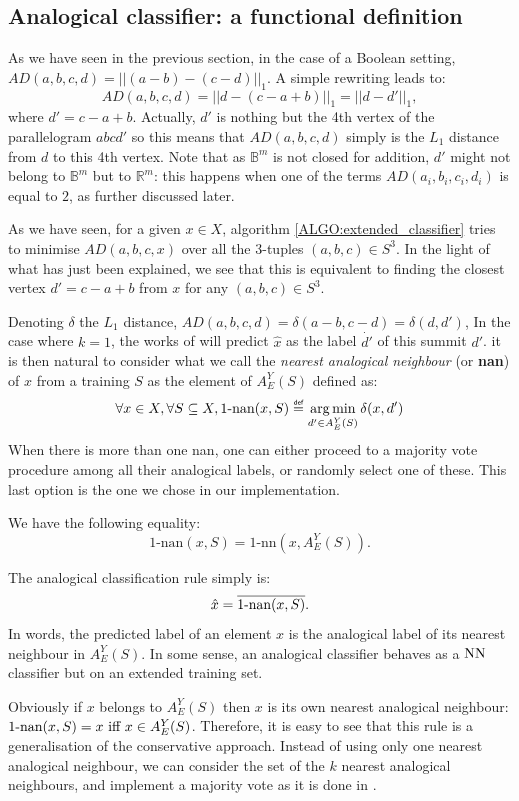 \subsection{Analogical classifier: a functional definition}\label{FUNCTIONAL_DEF}

As we have seen in the previous section, in the case of a Boolean setting,
$AD(a,b,c,d)= ||(a-b)-(c-d)||_1$.  A simple rewriting leads to:
$$AD(a,b,c,d)=||d - (c-a+b)||_1=||d - d'||_1,$$
where $d'=c-a+b$. Actually, $d'$ is nothing but the 4th vertex of the
parallelogram $abcd'$ so this means that $AD(a,b,c,d)$ simply is the $L_1$ distance
 from $d$ to this 4th vertex. Note that as $\mathbb{B}^m$ is not closed for
addition, $d'$ might not belong to $\mathbb{B}^m$ but to $\mathbb{R}^m$: this
happens when one of the terms $AD(a_i, b_i, c_i, d_i)$ is equal to $2$, as
further discussed later.

As we have seen, for a given $x \in X$, algorithm \ref{ALGO:extended_classifier} tries to
minimise $AD(a,b,c,x)$ over all the 3-tuples $(a,b,c) \in S^3$. In the
light of what has just been explained, we see that this is equivalent to
finding the closest vertex $d'=c-a+b$  from $x$ for any $(a, b, c) \in S^3$.


Denoting $\delta$ the $L_1$ distance, $AD(a,b,c,d) =\delta(a-b,c-d) =
\delta(d,d')$,
In the case where $k=1$, the
works of \cite{BayMicDelIJCAI07} will predict $\hat{x}$ as the label $\dot{d'}$ of
this summit $d'$. 
it is then natural to consider what we call the \textit{nearest analogical
neighbour} (or \textbf{nan}) of $x$ from a training $S$ as the element of
$A_E^Y(S)$ defined as:
$$\forall x \in X, \forall S \subseteq X, 1\mbox{-nan}(x,S)\eqdef \argmin_{d'
\in A_E^Y(S)} \delta(x,d')$$
When there is more than one nan, one can either proceed to a majority vote
procedure among all their analogical labels, or randomly select one of these.
This last option is the one we chose in our implementation.
\begin{property} \label{propnn}We have the following equality:
$$1\mbox{-nan}(x,S)= 1\mbox{-nn}(x,A_E^Y(S)).$$
\end{property}
The analogical classification rule simply is:
$$\hat{x} = \overline{1\mbox{-nan}(x,S)}.$$
In words, the predicted label of an element $x$ is the analogical label of its
nearest neighbour in $A_E^Y(S)$.
In some sense, an analogical classifier behaves
as a $\mbox{NN}$ classifier but on an extended training set.

Obviously if $x$ belongs to $A_E^Y(S)$ then $x$ is its own nearest analogical
neighbour: $1\mbox{-nan}(x, S) = x \text{ iff } x \in A_E^Y(S)$. Therefore, it is easy
to see that this rule is a generalisation of the conservative approach.
Instead of using only one nearest analogical neighbour, we can consider the set
of the $k$ nearest analogical neighbours, and implement a majority vote as it is
done in \cite{MicBayDelJAIR08}.

